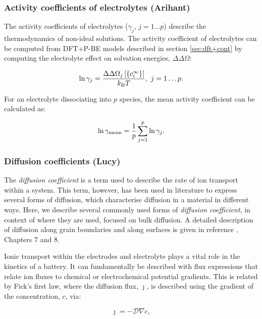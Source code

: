\documentclass[../main.tex]{subfiles}
\begin{document}
\subsubsection{Activity coefficients of electrolytes (Arihant)}
\label{sec:tf}
The activity coefficients of electrolytes ($\gamma_j$, $j=1\dots p$) describe the thermodynamics of non-ideal solutions.\cite{Atkins2014} The activity coefficient of electrolytes can be computed from DFT+P-BE models described in section \ref{sec:dft+cont} by computing the electrolyte effect on solvation energies, $\Delta\Delta\Omega$:\cite{Ringe2016, Dziedzic2020}

\begin{equation}
    \label{eq:activityj}
   \ln{\gamma_j}  =\frac{\Delta\Delta\Omega_j\left[\{c_i^{\infty}\}\right]}{k_{\textrm{B}} T}, \ j=1\dots p.
\end{equation}

For an electrolyte dissociating into $p$ species, the mean activity coefficient can be calculated as:

\begin{equation}
    \label{eq:activitymean}
    \ln \gamma_{\rm mean} = \frac{1}{p}\sum_{j=1}^p \ln \gamma_j.
\end{equation}

\subsubsection{Diffusion coefficients (Lucy)}
\label{sec:diffusion}
The \textit{diffusion coefficient} is a term used to describe the rate of ion transport within a system. This term, however, has been used in literature to express several forms of diffusion, which characterise diffusion in a material in different ways. Here, we describe several commonly used forms of \textit{diffusion coefficient}, in context of where they are used, focused on bulk diffusion. A detailed description of diffusion along grain boundaries and along surfaces is given in reference , Chapters 7 and 8.

Ionic transport within the electrodes and electrolyte plays a vital role in the kinetics of a battery. It can fundamentally be described with flux expressions that relate ion fluxes to chemical or electrochemical potential gradients. This is related by Fick's first law, where the diffusion flux, $\boldsymbol{\jmath}$, is described using the gradient of the concentration, $c$, via:

\begin{equation}
    \boldsymbol{\jmath} = - \mathcal{D} \nabla c,
    \label{eq:fickfirst}
\end{equation}
\end{document}
